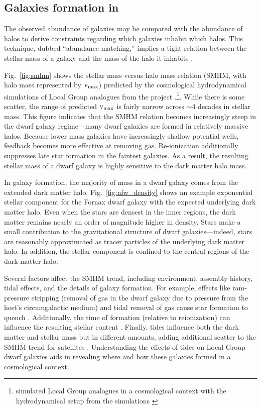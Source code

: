 \subsection{\texorpdfstring{Galaxies formation in
\LCDM{}}{Galaxies formation in }}\label{galaxies-formation-in}

The observed abundance of galaxies may be compared with the abundance of
\LCDM{} halos to derive constraints regarding which galaxies inhabit
which halos. This technique, dubbed ``abundance matching,'' implies a
tight relation between the stellar mass of a galaxy and the mass of the
halo it inhabits \citep{li+white2009, moster+naab+white2013}.

Fig.~\ref{fig:smhm} shows the stellar mass versus halo mass relation
(SMHM, with halo mass represented by \({\rm v}_{\rm max}\)) predicted by the \LCDM{}
cosmological hydrodynamical simulations of Local Group analogues from
the \apostle{} project \citep{sawala+2016}.\footnote{\apostle{}
  simulated Local Group analogues in a \LCDM{} cosmological context with
  the hydrodynamical setup from the \eagle{} simulations
  \citep{crain+2015, schaye+2015}}. While there is some scatter, the
range of predicted \({\rm v}_{\rm max}\) is fairly narrow across \(\sim 4\) decades
in stellar mass. This figure indicates that the SMHM relation becomes
increasingly steep in the dwarf galaxy regime---many dwarf galaxies are
formed in relatively massive halos. Because lower mass galaxies have
increasingly shallow potential wells, feedback becomes more effective at
removing gas. Re-ionization additionally suppresses late star formation
in the faintest galaxies. As a result, the resulting stellar mass of a
dwarf galaxy is highly sensitive to the dark matter halo mass.

In \LCDM{} galaxy formation, the majority of mass in a dwarf galaxy
comes from the extended dark matter halo. Fig.~\ref{fig:nfw_density}
shows an example exponential stellar component for the Fornax dwarf
galaxy with the expected underlying dark matter halo. Even when the
stars are densest in the inner regions, the dark matter remains nearly
an order of magnitude higher in density. Stars make a small contribution
to the gravitational structure of dwarf galaxies---indeed, stars are
reasonably approximated as tracer particles of the underlying dark
matter halo. In addition, the stellar component is confined to the
central regions of the dark matter halo.

Several factors affect the SMHM trend, including environment, assembly
history, tidal effects, and the details of galaxy formation. For
example, effects like ram-pressure stripping (removal of gas in the
dwarf galaxy due to pressure from the host's circumgalactic medium) and
tidal removal of gas cause star formation to quench
\citep[e.g.,][]{christensen+2024}. Additionally, the time of formation
(relative to reionization) can influence the resulting stellar content
\citep{kim+2024}. Finally, tides influence both the dark matter and
stellar mass but in different amounts, adding additional scatter to the
SMHM trend for satellites \citep[e.g.,][]{PNM2008, fattahi+2018}.
Understanding the effects of tides on Local Group dwarf galaxies aids in
revealing where and how these galaxies formed in a cosmological context.

